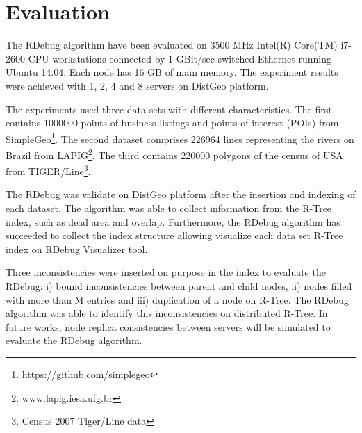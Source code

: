 \section{Evaluation}
\label{sec:evaluation}	

The RDebug algorithm have been evaluated on 3500 MHz Intel(R) Core(TM) i7-2600 CPU workstations
connected by 1 GBit/sec switched Ethernet running Ubuntu 14.04. Each node has 16 GB of main memory.
The experiment results were achieved with 1, 2, 4 and 8 servers on DistGeo platform.

The experiments used three data sets with different characteristics.
The first contains 1000000 points of business listings and points of interest (POIs) from SimpleGeo\footnote{https://github.com/simplegeo}.
The second dataset comprises 226964 lines representing the rivers on Brazil from LAPIG\footnote{www.lapig.iesa.ufg.br}. 
The third contains 220000 polygons of the census of USA from TIGER/Line\footnote{Census 2007 Tiger/Line data}.

The RDebug was validate on DistGeo platform after the insertion and indexing of each dataset.
The algorithm was able to collect information from the R-Tree index, such as dead area and overlap.
Furthermore, the RDebug algorithm has succeeded to collect the index structure allowing visualize each data set R-Tree index on RDebug Visualizer tool.

Three inconsistencies were inserted on purpose in the index to evaluate the RDebug: 
i) bound inconsistencies between parent and child nodes, ii) nodes filled with more than M entries and iii) duplication of a node on R-Tree. 
The RDebug algorithm was able to identify this inconsistencies on distributed R-Tree. 
In future works, node replica consistencies between servers will be simulated to evaluate the RDebug algorithm.